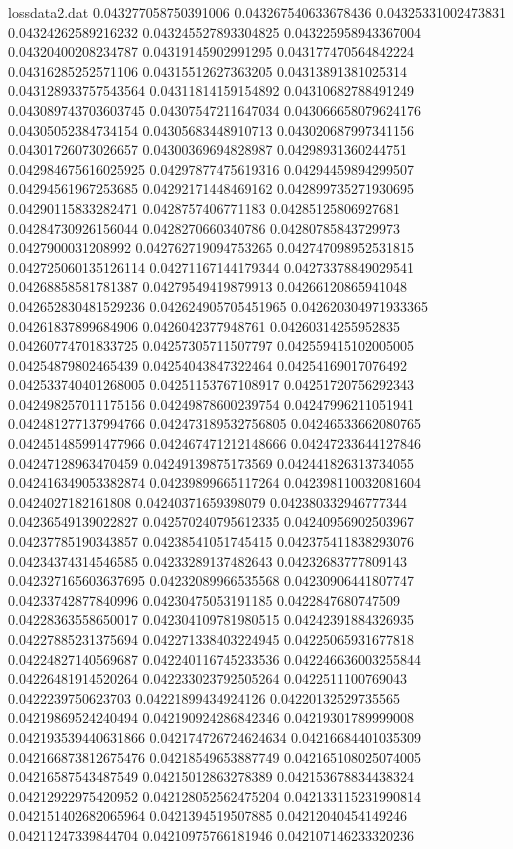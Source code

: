 \begin{filecontents*}{lossdata2.dat}
0.043277058750391006
0.043267540633678436
0.04325331002473831
0.04324262589216232
0.043245527893304825
0.043225958943367004
0.04320400208234787
0.04319145902991295
0.043177470564842224
0.04316285252571106
0.04315512627363205
0.04313891381025314
0.043128933757543564
0.04311814159154892
0.04310682788491249
0.043089743703603745
0.04307547211647034
0.043066658079624176
0.04305052384734154
0.04305683448910713
0.043020687997341156
0.04301726073026657
0.04300369694828987
0.04298931360244751
0.042984675616025925
0.04297877475619316
0.04294459894299507
0.04294561967253685
0.04292171448469162
0.042899735271930695
0.04290115833282471
0.0428757406771183
0.04285125806927681
0.04284730926156044
0.0428270660340786
0.04280785843729973
0.0427900031208992
0.042762719094753265
0.042747098952531815
0.042725060135126114
0.04271167144179344
0.04273378849029541
0.04268858581781387
0.04279549419879913
0.04266120865941048
0.042652830481529236
0.042624905705451965
0.042620304971933365
0.04261837899684906
0.0426042377948761
0.04260314255952835
0.04260774701833725
0.04257305711507797
0.042559415102005005
0.04254879802465439
0.04254043847322464
0.04254169017076492
0.042533740401268005
0.04251153767108917
0.04251720756292343
0.042498257011175156
0.04249878600239754
0.04247996211051941
0.042481277137994766
0.042473189532756805
0.04246533662080765
0.042451485991477966
0.042467471212148666
0.04247233644127846
0.04247128963470459
0.04249139875173569
0.042441826313734055
0.042416349053382874
0.04239899665117264
0.042398110032081604
0.0424027182161808
0.04240371659398079
0.042380332946777344
0.04236549139022827
0.042570240795612335
0.04240956902503967
0.04237785190343857
0.04238541051745415
0.042375411838293076
0.04234374314546585
0.04233289137482643
0.04232683777809143
0.042327165603637695
0.04232089966535568
0.04230906441807747
0.04233742877840996
0.04230475053191185
0.0422847680747509
0.04228363558650017
0.042304109781980515
0.04242391884326935
0.04227885231375694
0.042271338403224945
0.04225065931677818
0.04224827140569687
0.042240116745233536
0.042246636003255844
0.04226481914520264
0.042233023792505264
0.0422511100769043
0.0422239750623703
0.04221899434924126
0.04220132529735565
0.04219869524240494
0.042190924286842346
0.04219301789999008
0.042193539440631866
0.042174726724624634
0.04216684401035309
0.042166873812675476
0.04218549653887749
0.042165108025074005
0.04216587543487549
0.04215012863278389
0.042153678834438324
0.04212922975420952
0.042128052562475204
0.042133115231990814
0.042151402682065964
0.0421394519507885
0.04212040454149246
0.04211247339844704
0.04210975766181946
0.042107146233320236

\end{filecontents*}
